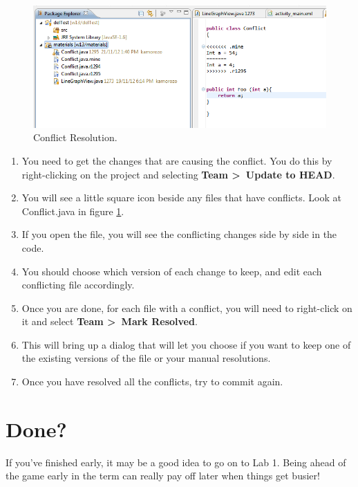 \documentclass[10pt]{article}
\begin{document}
\begin{figure}[htbp]
\begin{center}
\includegraphics[width=\textwidth]{conflict.png}
\end{center}
\caption{\label{fig:conflict}Conflict Resolution.}
\end{figure}

\begin{enumerate}
\item You need to get the changes that are causing the conflict. You do this by right-clicking on the project and selecting \textbf{Team \textgreater~Update to HEAD}.
\item You will see a little square icon beside any files that have conflicts. Look at Conflict.java in figure \ref{fig:conflict}.
\item If you open the file, you will see the conflicting changes side by side in the code.
\item You should choose which version of each change to keep, and edit each conflicting file accordingly.
\item Once you are done, for each file with a conflict, you will need to right-click on it and select \textbf{Team \textgreater~Mark Resolved}.
\item This will bring up a dialog that will let you choose if you want to keep one of the existing versions of the file or your manual resolutions.
\item Once you have resolved all the conflicts, try to commit again.
\end{enumerate}

\section{Done?}
If you've finished early, it may be a good idea to go on to Lab 1. Being ahead of the game early in the term can really pay off later when things get busier!

\end{document}
